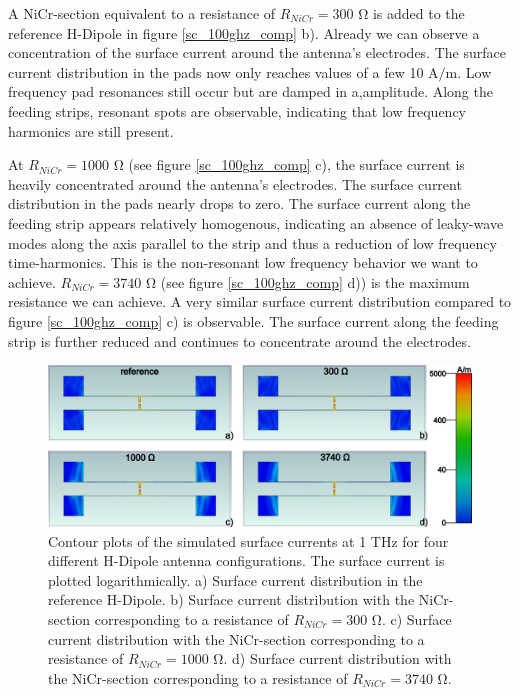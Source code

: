 A NiCr-section equivalent to a resistance of $R_{NiCr} = 300$ \si{\ohm} is added to the reference H-Dipole in figure \ref{sc_100ghz_comp} b). Already we can observe a concentration of the surface current around the antenna's electrodes. The surface current distribution in the pads now only reaches values of a few 10 A$/$m. Low frequency pad resonances still occur but are damped in a,amplitude. Along the feeding strips, resonant spots are observable, indicating that low frequency harmonics are still present. 


At $R_{NiCr} = 1000$ \si{\ohm} (see figure \ref{sc_100ghz_comp} c), the surface current is heavily concentrated around the antenna's electrodes. The surface current distribution in the pads nearly drops to zero. The surface current along the feeding strip appears relatively homogenous, indicating an absence of leaky-wave modes along the axis parallel to the strip and thus a reduction of low frequency time-harmonics. This is the non-resonant low frequency behavior we want to achieve. $R_{NiCr} = 3740$ \si{\ohm} (see figure \ref{sc_100ghz_comp} d)) is the maximum resistance we can achieve. A very similar surface current distribution compared to figure \ref{sc_100ghz_comp} c) is observable. The surface current along the feeding strip is further reduced and continues to concentrate around the electrodes. 

\begin{figure}[ht]
    \centering
    \includegraphics[width=\linewidth]{figures/Contour_Plots_v2/1Thz_SC_sim_plots.png}
    \caption{Contour plots of the simulated surface currents at \num{1} \si{\tera \hertz} for four different H-Dipole antenna configurations. The surface current is plotted logarithmically. a) Surface current distribution in the reference H-Dipole. b) Surface current distribution with the NiCr-section corresponding to a resistance of $R_{NiCr} = 300$ \si{\ohm}. c) Surface current distribution with the NiCr-section corresponding to a resistance of $R_{NiCr} = 1000$ \si{\ohm}. d) Surface current distribution with the NiCr-section corresponding to a resistance of $R_{NiCr} = 3740$ \si{\ohm}.}
    \label{sc_1thz_comp}
\end{figure}

